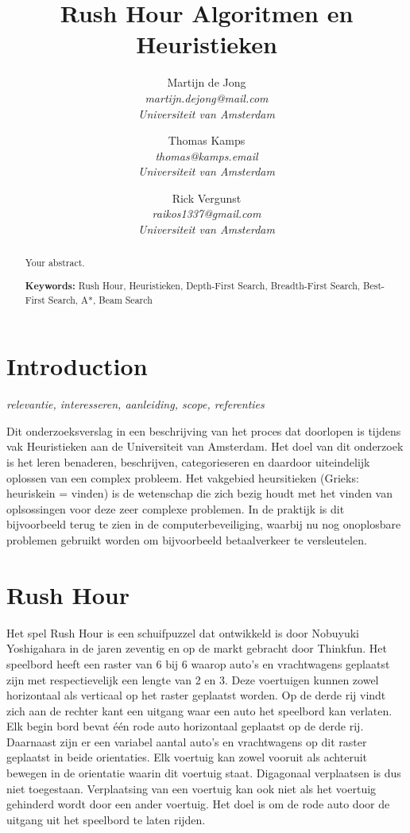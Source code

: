\documentclass[a4paper]{article}
\title{Rush Hour Algoritmen en Heuristieken}
\author{
  Martijn de Jong\\
  \textit{martijn.dejong@mail.com}\\
  \textit{Universiteit van Amsterdam}
  \and
  Thomas Kamps\\
  \textit{thomas@kamps.email}\\
  \textit{Universiteit van Amsterdam}
  \and
  Rick Vergunst\\
  \textit{raikos1337@gmail.com}\\
  \textit{Universiteit van Amsterdam}
}
\begin{document}
\maketitle

\begin{abstract}
Your abstract.

\vspace{5mm}
\textbf{Keywords:} Rush Hour, Heuristieken, Depth-First Search, Breadth-First Search, Best-First Search, A*, Beam Search
\end{abstract}

\section{Introduction}
\textit{relevantie, interesseren, aanleiding, scope, referenties}

Dit onderzoeksverslag in een beschrijving van het proces dat doorlopen is tijdens vak Heuristieken aan de Universiteit van Amsterdam. Het doel van dit onderzoek is het leren benaderen, beschrijven, categorieseren en daardoor uiteindelijk oplossen van een complex probleem. Het vakgebied heursitieken (Grieks: heuriskein = vinden) is de wetenschap die zich bezig houdt met het vinden van oplsossingen voor deze zeer complexe problemen. In de praktijk is dit bijvoorbeeld terug te zien in de computerbeveiliging, waarbij nu nog onoplosbare problemen gebruikt worden om bijvoorbeeld betaalverkeer te versleutelen.

\section{Rush Hour}
Het spel Rush Hour is een schuifpuzzel dat ontwikkeld is door Nobuyuki Yoshigahara in de jaren zeventig en op de markt gebracht door Thinkfun. Het speelbord heeft een raster van 6 bij 6 waarop auto's en vrachtwagens geplaatst zijn met respectievelijk een lengte van 2 en 3. Deze voertuigen kunnen zowel horizontaal als verticaal op het raster geplaatst worden. Op de derde rij vindt zich aan de rechter kant een uitgang waar een auto het speelbord kan verlaten. Elk begin bord bevat één rode auto horizontaal geplaatst op de derde rij. Daarnaast zijn er een variabel aantal auto's en vrachtwagens op dit raster geplaatst in beide orientaties. Elk voertuig kan zowel vooruit als achteruit bewegen in de orientatie waarin dit voertuig staat. Digagonaal verplaatsen is dus niet toegestaan. Verplaatsing van een voertuig kan ook niet als het voertuig gehinderd wordt door een ander voertuig. Het doel is om de rode auto door de uitgang uit het speelbord te laten rijden. 
\end{document}
